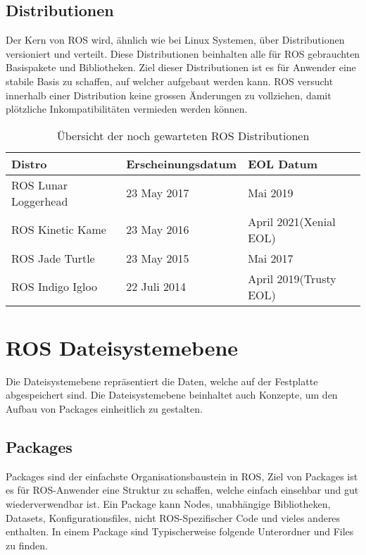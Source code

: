 \subsection{Distributionen}\label{sec:Distro}
Der Kern von ROS wird, ähnlich wie bei Linux Systemen, über Distributionen versioniert und verteilt. Diese Distributionen beinhalten alle für ROS gebrauchten Basispakete und Bibliotheken. Ziel dieser Distributionen ist es für Anwender eine stabile Basis zu schaffen, auf welcher aufgebaut werden kann. ROS versucht innerhalb einer Distribution keine grossen Änderungen zu vollziehen, damit plötzliche Inkompatibilitäten vermieden werden können.
\begin{table}[H]
	\centering
	\begin{tabular}{lll}
		\textbf{Distro}      & \textbf{Erscheinungsdatum} & \textbf{EOL Datum}     \\ \hline
		ROS Lunar Loggerhead & 23 May 2017                & Mai 2019               \\
		ROS Kinetic Kame     & 23 May 2016                & April 2021(Xenial EOL) \\
		ROS Jade Turtle      & 23 May 2015                & Mai 2017               \\
		ROS Indigo Igloo     & 22 Juli 2014               & April 2019(Trusty EOL)
	\end{tabular}
	\caption[Übersicht der noch gewarteten ROS Distributionen]{Übersicht der noch gewarteten ROS Distributionen\cite{Saito2017}}
	\label{tab:ROSDistros}
\end{table}
 
\section{ROS Dateisystemebene} \label{sec:ROSDateisystemeben}
Die Dateisystemebene repräsentiert die Daten, welche auf der Festplatte abgespeichert sind. Die Dateisystemebene beinhaltet auch Konzepte, um den Aufbau von Packages einheitlich zu gestalten.
\subsection{Packages} \label{sec:Packages}
Packages sind der einfachste Organisationsbaustein in ROS, Ziel von Packages ist es für ROS-Anwender eine Struktur zu schaffen, welche einfach einsehbar und gut wiederverwendbar ist. Ein Package kann Nodes, unabhängige Bibliotheken, Datasets, Konfigurationsfiles, nicht ROS-Spezifischer Code und vieles anderes enthalten. In einem Package sind Typischerweise folgende Unterordner und Files zu finden.

